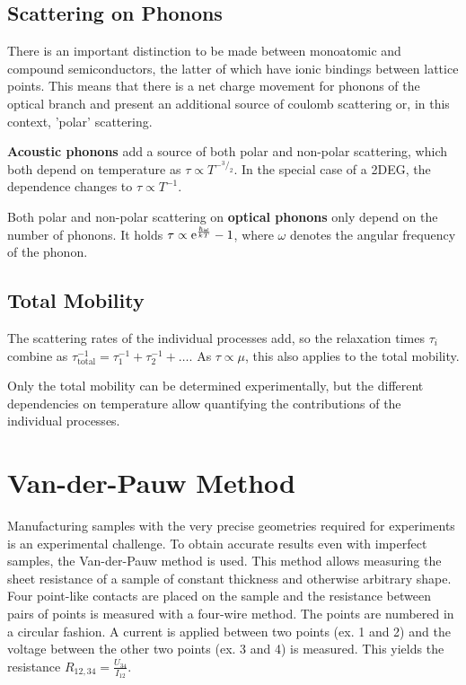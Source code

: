 \subsection{Scattering on Phonons}\label{subsec:phonons}
There is an important distinction to be made between monoatomic and compound semiconductors, the latter of which have ionic bindings between lattice points.
This means that there is a net charge movement for phonons of the optical branch and present an additional source of coulomb scattering or, in this context, 'polar' scattering.

\textbf{Acoustic phonons} add a source of both polar and non-polar scattering, which both depend on temperature as $\tau \propto T^{-{^3}/_2}$.
In the special case of a 2DEG, the dependence changes to $\tau \propto T^{-1}$.

Both polar and non-polar scattering on \textbf{optical phonons} only depend on the number of phonons.
It holds $\tau \propto \mathrm{e}^\frac{\hbar \omega}{k T} - 1$, where $\omega$ denotes the angular frequency of the phonon.

\subsection{Total Mobility}
The scattering rates of the individual processes add, so the relaxation times $\tau_i$ combine as $\tau_\text{total}^{-1} = \tau_1^{-1} + \tau_2^{-1} + \dots$.
As $\tau \propto \mu$, this also applies to the total mobility.

Only the total mobility can be determined experimentally, but the different dependencies on temperature allow quantifying the contributions of the individual processes.

\section{Van-der-Pauw Method}\label{sec:van-der-pauw-geometry}
Manufacturing samples with the very precise geometries required for experiments is an experimental challenge.
To obtain accurate results even with imperfect samples, the Van-der-Pauw method is used.
This method allows measuring the sheet resistance of a sample of constant thickness and otherwise arbitrary shape.
Four point-like contacts are placed on the sample and the resistance between pairs of points is measured with a four-wire method.
The points are numbered in a circular fashion.
A current is applied between two points (ex. 1 and 2) and the voltage between the other two points (ex. 3 and 4) is measured.
This yields the resistance $R_{12,34} = \frac{U_{34}}{I_{12}}$.

